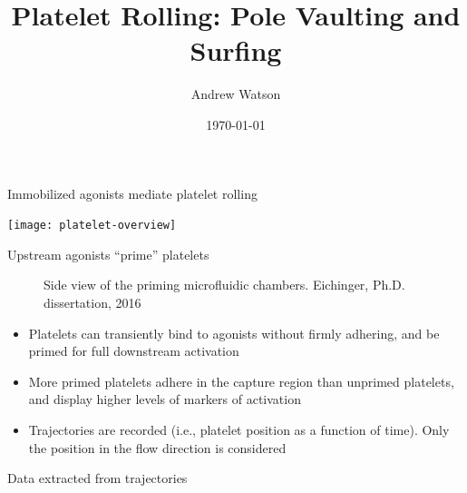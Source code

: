 \documentclass[10pt]{beamer}
\title{Platelet Rolling: Pole Vaulting and Surfing}
\date{\today}
\author{Andrew Watson}
\institute{University of Utah}
\begin{document}
\maketitle



\begin{frame}{Immobilized agonists mediate platelet rolling}
  \begin{center}
    \texttt{[image: platelet-overview]}
  \end{center}
\end{frame}

\begin{frame}{Upstream agonists ``prime'' platelets}
  \begin{figure}
    \centering
    \setlength{\fboxsep}{0pt}
    \setlength{\fboxrule}{.25pt}
    \caption{Side view of the priming microfluidic
      chambers. Eichinger, Ph.D. dissertation, 2016}
    \label{fig:flow-chambers}
  \end{figure}

  \begin{itemize}
  \item Platelets can transiently bind to agonists without firmly
    adhering, and be primed for full downstream activation
  \item More primed platelets adhere in the capture region than
    unprimed platelets, and display higher levels of markers of
    activation 
  \item Trajectories are recorded (i.e., platelet position as a
    function of time). Only the position in the flow direction is
    considered
  \end{itemize}
\end{frame}

\begin{frame}{Data extracted from trajectories}
  \begin{center}
  \end{center}
\end{frame}
\end{document}
